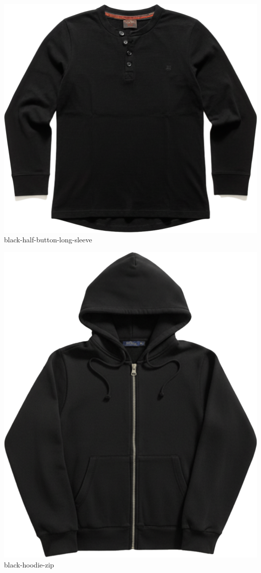 \documentclass[10pt]{article}
\begin{document}
\begin{minipage}[t]{0.22\textwidth}\centering\vspace{0mm}
\includegraphics[width=\linewidth,keepaspectratio]{assets/midlayer/black-half-button-long-sleeve.png}\\
\vspace{0.5mm}\tiny black-half-button-long-sleeve\end{minipage}
\begin{minipage}[t]{0.22\textwidth}\centering\vspace{0mm}
\includegraphics[width=\linewidth,keepaspectratio]{assets/midlayer/black-hoodie-zip.png}\\
\vspace{0.5mm}\tiny black-hoodie-zip\end{minipage}
\end{document}
